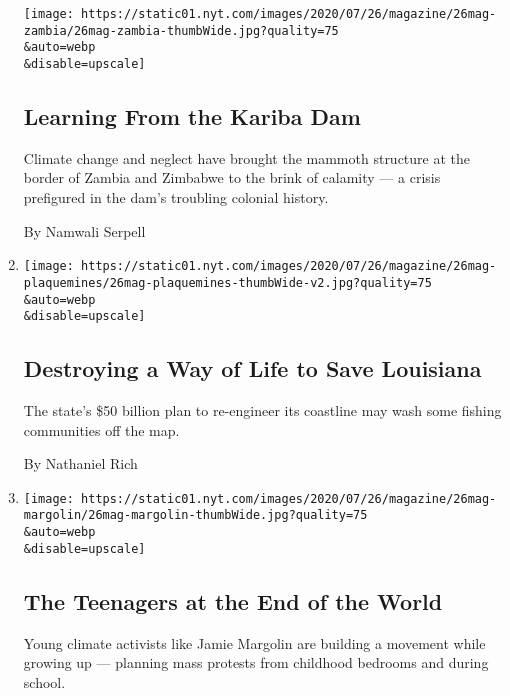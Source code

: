 \begin{enumerate}
  \texttt{[image: https://static01.nyt.com/images/2020/07/26/magazine/26mag-zambia/26mag-zambia-thumbWide.jpg?quality=75\\\&auto=webp\\\&disable=upscale]}

  \hypertarget{learning-from-the-kariba-dam}{%
  \subsection{Learning From the Kariba
  Dam}\label{learning-from-the-kariba-dam}}

  Climate change and neglect have brought the mammoth structure at the
  border of Zambia and Zimbabwe to the brink of calamity --- a crisis
  prefigured in the dam's troubling colonial history.

  By Namwali Serpell
\item
  \href{/interactive/2020/07/21/magazine/louisiana-coast-engineering.html}{}

  \texttt{[image: https://static01.nyt.com/images/2020/07/26/magazine/26mag-plaquemines/26mag-plaquemines-thumbWide-v2.jpg?quality=75\\\&auto=webp\\\&disable=upscale]}

  \hypertarget{destroying-a-way-of-life-to-save-louisiana}{%
  \subsection{Destroying a Way of Life to Save
  Louisiana}\label{destroying-a-way-of-life-to-save-louisiana}}

  The state's \$50 billion plan to re-engineer its coastline may wash
  some fishing communities off the map.

  By Nathaniel Rich
\item
  \href{/interactive/2020/07/21/magazine/teenage-activist-climate-change.html}{}

  \texttt{[image: https://static01.nyt.com/images/2020/07/26/magazine/26mag-margolin/26mag-margolin-thumbWide.jpg?quality=75\\\&auto=webp\\\&disable=upscale]}

  \hypertarget{the-teenagers-at-the-end-of-the-world}{%
  \subsection{The Teenagers at the End of the
  World}\label{the-teenagers-at-the-end-of-the-world}}

  Young climate activists like Jamie Margolin are building a movement
  while growing up --- planning mass protests from childhood bedrooms
  and during school.


\end{enumerate}
